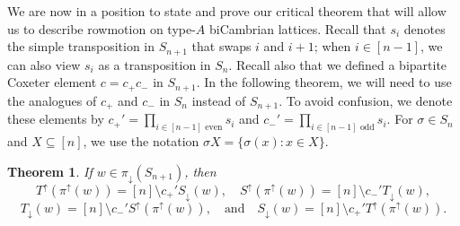 \documentclass[11pt]{amsart}
\newtheorem{theorem}{Theorem}[section]
\theoremstyle{definition}
\begin{document}
We are now in a position to state and prove our critical theorem that will allow us to describe rowmotion on type-$A$ biCambrian lattices. Recall that $s_i$ denotes the simple transposition in $S_{n+1}$ that swaps $i$ and $i+1$; when $i\in[n-1]$, we can also view $s_i$ as a transposition in $S_n$. Recall also that we defined a bipartite Coxeter element $c=c_+c_-$ in $S_{n+1}$. In the following theorem, we will need to use the analogues of $c_+$ and $c_-$ in $S_n$ instead of $S_{n+1}$. To avoid confusion, we denote these elements by $c_+'=\prod_{i\in[n-1]\text{ even}}s_i$ and $c_-'=\prod_{i\in[n-1]\text{ odd}}s_i$. For $\sigma\in S_n$ and $X\subseteq[n]$, we use the notation $\sigma X=\{\sigma(x):x\in X\}$. 

\begin{theorem}\label{thm:STupintermsofSTdown}
    If $w\in \pi_\downarrow(S_{n+1})$, then
    \[T^\uparrow(\pi^\uparrow(w))=[n]\setminus c_+'S_\downarrow(w),\quad S^\uparrow(\pi^\uparrow(w))=[n]\setminus c_-'T_\downarrow(w),\] \[T_\downarrow(w)=[n]\setminus c_-'S^\uparrow(\pi^\uparrow(w)),\quad\text{and}\quad
S_\downarrow(w)=[n]\setminus c_+'T^\uparrow(\pi^\uparrow(w)).\]
    \end{theorem}
\end{document}
